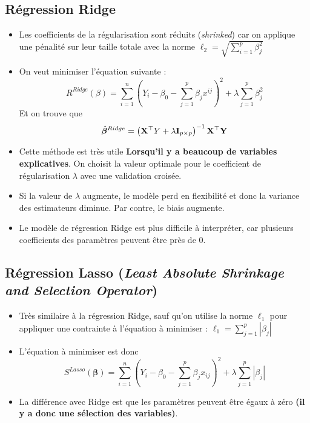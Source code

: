 \documentclass[10pt, french]{article}
\begin{document}
\begin{multicols*}{3}
\subsection*{Régression Ridge}
\begin{itemize}
\item Les coefficients de la régularisation sont réduits (\emph{shrinked}) car on applique une pénalité sur leur taille totale avec la norme $\ell_2 = \sqrt{\sum_{i=1}^{p} \beta_j^2}$
\item On veut minimiser l'équation suivante : 
\[R^{Ridge}(\beta) = \sum_{i=1}^{n} \left( Y_i - \beta_0 - \sum_{j=1}^{p} \beta_j x^{ij} \right)^2 + \lambda \sum_{j=1}^{p} \beta_j^2  \]
Et on trouve que
\[\hat{\bm{\beta}}^{Ridge} = \left( \mathbf{X}^\top Y + \lambda \mathbf{I}_{p \times p} \right)^{-1}  \mathbf{X}^\top \mathbf{Y}  \]
\item Cette méthode est très utile \textbf{Lorsqu'il y a beaucoup de variables explicatives}. On choisit la valeur optimale pour le coefficient de régularisation $\lambda$ avec une validation croisée.
\item Si la valeur de $\lambda$ augmente, le modèle perd en flexibilité et donc la variance des estimateurs diminue. Par contre, le biais augmente.
\item Le modèle de régression Ridge est plus difficile à interpréter, car plusieurs coefficients des paramètres peuvent être près de 0.
\end{itemize}

\subsection*{Régression Lasso (\emph{Least Absolute Shrinkage and Selection Operator})}
\begin{itemize}
\item Très similaire à la régression Ridge, sauf qu'on utilise la norme $\ell_1$ pour appliquer une contrainte à l'équation à minimiser : 
$\ell_1 = \sum_{j=1}^{p} | \beta_j | $

\item L'équation à minimiser est donc
\[S^{Lasso}(\bm{\beta})  = \sum_{i=1}^{n} \left( Y_i - \beta_0 - \sum_{j=1}^{p} \beta_j x_{ij} \right)^2 + \lambda \sum_{j=1}^{p} | \beta_j | \]

\item La différence avec Ridge est que les paramètres peuvent être égaux à zéro \textbf{(il y a donc une sélection des variables)}.
\end{itemize}




\end{multicols*}
\end{document}
